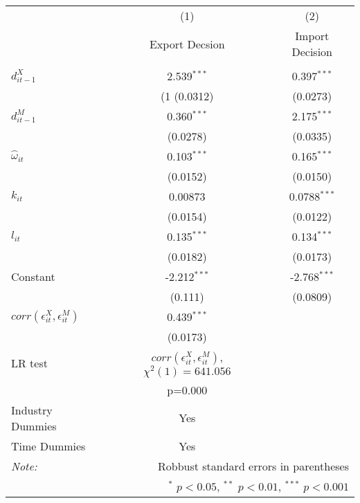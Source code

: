 \begin{center}
\begin{tabular}{l*{2}{c}}
\hline\hline
            &\multicolumn{1}{c}{(1)}&\multicolumn{1}{c}{(2)}\\
            &\multicolumn{1}{c}{Export
              Decsion}&\multicolumn{1}{c}{Import Decision}\\
\hline\\

$d_{it-1}^{X}$  &          2.539$^{***}$    &   0.397$^{***}$ \\
            &    (1    (0.0312)             &(0.0273)         \\
[1em]                                                        
$d_{it-1}^{M}$      &      0.360$^{***}$    &   2.175$^{***}$\\
            &          (0.0278)             &(0.0335)         \\
[1em]                                                        
$\hat{\omega}_{it}$  &     0.103$^{***}$     &  0.165$^{***}$\\
            &          (0.0152)             &(0.0150)         \\
[1em]                                                        
$k_{it}$       &        0.00873              & 0.0788$^{***}$\\
            &          (0.0154)             &(0.0122)         \\
[1em]                                                        
$l_{it}$     &            0.135$^{***}$     &  0.134$^{***}$\\
            &          (0.0182)             &(0.0173)         \\
[1em]                                                        
Constant      &          -2.212$^{***}$     & -2.768$^{***}$\\
            &           (0.111)             &(0.0809)         \\
\hline
$corr(\epsilon_{it}^{X},\epsilon_{it}^{M}) $      &       0.439$^{***}$\\
            &    (0.0173)         \\
LR test& $corr(\epsilon_{it}^{X},\epsilon_{it}^{M})$, $\chi^{2}(1)= 641.056$&\\
& p=0.000&\\
Industry Dummies & Yes& \\
Time Dummies& Yes& \\
\hline\hline
\textit{Note:}&\multicolumn{2}{r}{\footnotesize  Robbust standard errors in parentheses}\\
&\multicolumn{2}{r}{\footnotesize $^{*}$ \(p<0.05\), $^{**}$ \(p<0.01\), $^{***}$ \(p<0.001\)}\\
\end{tabular}
\end{center}
